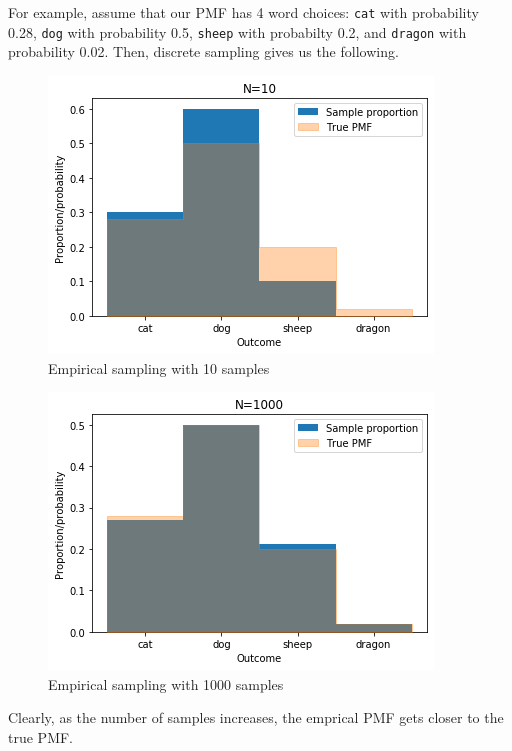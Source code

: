 \documentclass[a4paper, openany]{memoir}
\begin{document}
For example, assume that our PMF has 4 word choices: \texttt{cat} with probability 0.28, \texttt{dog} with probability 0.5, \texttt{sheep} with probabilty 0.2, and \texttt{dragon} with probability 0.02. Then, discrete sampling gives us the following.
\begin{figure}[H]
    \centering
    \includegraphics[scale=0.5]{src/5.3 emprical 10.png}
    \caption{Empirical sampling with 10 samples}
\end{figure}
\begin{figure}[H]
    \centering
    \includegraphics[scale=0.5]{src/5.4 empirical 1000.png}
    \caption{Empirical sampling with 1000 samples}
\end{figure}
\noindent Clearly, as the number of samples increases, the emprical PMF gets closer to the true PMF.
\end{document}
